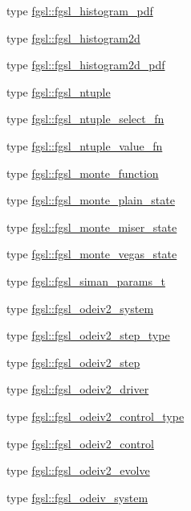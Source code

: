 \begin{DoxyCompactItemize}
\item 
type \hyperlink{structfgsl_1_1fgsl__histogram__pdf}{fgsl\-::fgsl\-\_\-histogram\-\_\-pdf}
\item 
type \hyperlink{structfgsl_1_1fgsl__histogram2d}{fgsl\-::fgsl\-\_\-histogram2d}
\item 
type \hyperlink{structfgsl_1_1fgsl__histogram2d__pdf}{fgsl\-::fgsl\-\_\-histogram2d\-\_\-pdf}
\item 
type \hyperlink{structfgsl_1_1fgsl__ntuple}{fgsl\-::fgsl\-\_\-ntuple}
\item 
type \hyperlink{structfgsl_1_1fgsl__ntuple__select__fn}{fgsl\-::fgsl\-\_\-ntuple\-\_\-select\-\_\-fn}
\item 
type \hyperlink{structfgsl_1_1fgsl__ntuple__value__fn}{fgsl\-::fgsl\-\_\-ntuple\-\_\-value\-\_\-fn}
\item 
type \hyperlink{structfgsl_1_1fgsl__monte__function}{fgsl\-::fgsl\-\_\-monte\-\_\-function}
\item 
type \hyperlink{structfgsl_1_1fgsl__monte__plain__state}{fgsl\-::fgsl\-\_\-monte\-\_\-plain\-\_\-state}
\item 
type \hyperlink{structfgsl_1_1fgsl__monte__miser__state}{fgsl\-::fgsl\-\_\-monte\-\_\-miser\-\_\-state}
\item 
type \hyperlink{structfgsl_1_1fgsl__monte__vegas__state}{fgsl\-::fgsl\-\_\-monte\-\_\-vegas\-\_\-state}
\item 
type \hyperlink{structfgsl_1_1fgsl__siman__params__t}{fgsl\-::fgsl\-\_\-siman\-\_\-params\-\_\-t}
\item 
type \hyperlink{structfgsl_1_1fgsl__odeiv2__system}{fgsl\-::fgsl\-\_\-odeiv2\-\_\-system}
\item 
type \hyperlink{structfgsl_1_1fgsl__odeiv2__step__type}{fgsl\-::fgsl\-\_\-odeiv2\-\_\-step\-\_\-type}
\item 
type \hyperlink{structfgsl_1_1fgsl__odeiv2__step}{fgsl\-::fgsl\-\_\-odeiv2\-\_\-step}
\item 
type \hyperlink{structfgsl_1_1fgsl__odeiv2__driver}{fgsl\-::fgsl\-\_\-odeiv2\-\_\-driver}
\item 
type \hyperlink{structfgsl_1_1fgsl__odeiv2__control__type}{fgsl\-::fgsl\-\_\-odeiv2\-\_\-control\-\_\-type}
\item 
type \hyperlink{structfgsl_1_1fgsl__odeiv2__control}{fgsl\-::fgsl\-\_\-odeiv2\-\_\-control}
\item 
type \hyperlink{structfgsl_1_1fgsl__odeiv2__evolve}{fgsl\-::fgsl\-\_\-odeiv2\-\_\-evolve}
\item 
type \hyperlink{structfgsl_1_1fgsl__odeiv__system}{fgsl\-::fgsl\-\_\-odeiv\-\_\-system}

\end{DoxyCompactItemize}
